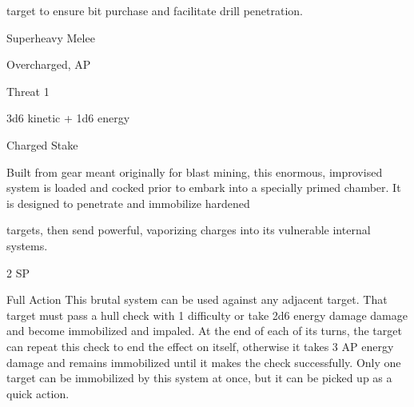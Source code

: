 target to ensure bit purchase and facilitate drill penetration.

Superheavy Melee

Overcharged, AP

Threat 1

3d6 kinetic + 1d6 energy


Charged Stake


Built from gear meant originally for blast mining, this enormous, improvised system is loaded and cocked
prior to embark into a specially primed chamber. It is designed to penetrate and immobilize hardened

targets, then send powerful, vaporizing charges into its vulnerable internal systems.

2 SP


Full Action
This brutal system can be used against any adjacent target. That target must pass a hull check
with 1 difficulty or take 2d6 energy damage damage and become immobilized and impaled. At
the end of each of its turns, the target can repeat this check to end the effect on itself, otherwise
it takes 3 AP energy damage and remains immobilized until it makes the check successfully. Only
one target can be immobilized by this system at once, but it can be picked up as a quick action.



